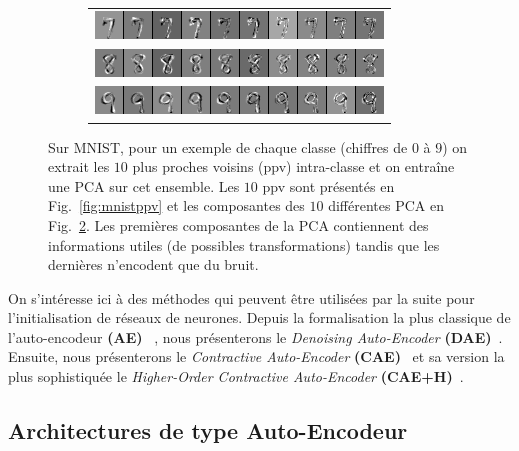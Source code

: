 \begin{figure}
\begin{subfigure}{0.45\textwidth}
\begin{tabular}{c}
  \includegraphics[width=0.90\linewidth]{predoc/images/7_eigenvectors.png}\\
  \includegraphics[width=0.90\linewidth]{predoc/images/8_eigenvectors.png}\\
  \includegraphics[width=0.90\linewidth]{predoc/images/9_eigenvectors.png}
\end{tabular}
\label{fig:mnistpca}
\end{subfigure}

   \caption{Sur MNIST, pour un exemple de chaque classe (chiffres de $0$ à $9$) on
   extrait les $10$ plus proches voisins (ppv) intra-classe et on entraîne une PCA sur cet
   ensemble. Les $10$ ppv sont présentés en Fig.~\ref{fig:mnistppv} et les
   composantes des $10$ différentes PCA en Fig.~\ref{fig:mnistpca}. Les premières composantes de
   la PCA contiennent des informations utiles (de possibles transformations)
   tandis que les dernières n'encodent que du bruit.}

\end{figure}


On s'intéresse ici à des méthodes qui peuvent être utilisées par la suite pour
l'initialisation de réseaux de neurones.
Depuis la formalisation la plus classique de l'auto-encodeur
\textbf{(AE)}~\cite{Gallinari87} , nous présenterons le \textit{Denoising
Auto-Encoder} \textbf{(DAE)}~\cite{VincentPLarochelleH2008,Vincent-JMLR-2010}.
Ensuite, nous présenterons le \textit{Contractive Auto-Encoder}
\textbf{(CAE)}~\cite{Rifai+al-2011,Salah+al-2011} et sa version la plus
sophistiquée le \textit{Higher-Order Contractive Auto-Encoder}
\textbf{(CAE+H)}~\cite{Salah+al-2011}.

\subsection{Architectures de type Auto-Encodeur}

